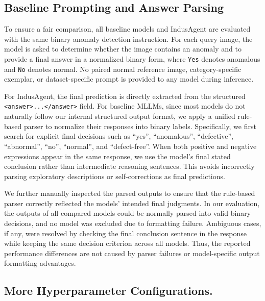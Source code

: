 \documentclass{article}
\begin{document}
{\subsection{Baseline Prompting and Answer Parsing}
\label{appx:baseline_parsing}

To ensure a fair comparison, all baseline models and IndusAgent are evaluated with the same binary anomaly detection instruction. 
For each query image, the model is asked to determine whether the image contains an anomaly and to provide a final answer in a normalized binary form, where \texttt{Yes} denotes anomalous and \texttt{No} denotes normal. 
No paired normal reference image, category-specific exemplar, or dataset-specific prompt is provided to any model during inference.

For IndusAgent, the final prediction is directly extracted from the structured \texttt{<answer>...</answer>} field. 
For baseline MLLMs, since most models do not naturally follow our internal structured output format, we apply a unified rule-based parser to normalize their responses into binary labels. 
Specifically, we first search for explicit final decisions such as ``yes'', ``anomalous'', ``defective'', ``abnormal'', ``no'', ``normal'', and ``defect-free''. 
When both positive and negative expressions appear in the same response, we use the model's final stated conclusion rather than intermediate reasoning sentences. 
This avoids incorrectly parsing exploratory descriptions or self-corrections as final predictions.

We further manually inspected the parsed outputs to ensure that the rule-based parser correctly reflected the models' intended final judgments. 
In our evaluation, the outputs of all compared models could be normally parsed into valid binary decisions, and no model was excluded due to formatting failure. 
Ambiguous cases, if any, were resolved by checking the final conclusion sentence in the response while keeping the same decision criterion across all models. 
Thus, the reported performance differences are not caused by parser failures or model-specific output formatting advantages.



\subsection{More Hyperparameter Configurations.}

}
\end{document}
